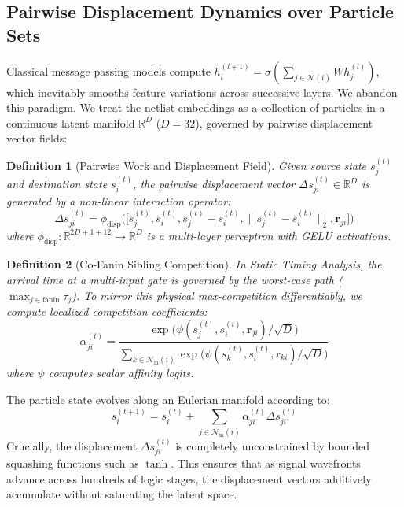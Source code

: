 \documentclass[conference]{IEEEtran}
\newtheorem{definition}{Definition}
\begin{document}
\subsection{Pairwise Displacement Dynamics over Particle Sets}
Classical message passing models compute $h_i^{(l+1)} = \sigma(\sum_{j \in \mathcal{N}(i)} W h_j^{(l)})$, which inevitably smooths feature variations across successive layers. We abandon this paradigm. We treat the netlist embeddings as a collection of particles in a continuous latent manifold $\mathbb{R}^D$ ($D=32$), governed by pairwise displacement vector fields:

\begin{definition}[Pairwise Work and Displacement Field]
Given source state $s_j^{(t)}$ and destination state $s_i^{(t)}$, the pairwise displacement vector $\Delta s_{ji}^{(t)} \in \mathbb{R}^D$ is generated by a non-linear interaction operator:
\begin{equation}
\Delta s_{ji}^{(t)} = \phi_{\text{disp}}\Big( \big[ s_j^{(t)}, s_i^{(t)}, s_j^{(t)} - s_i^{(t)}, \|s_j^{(t)} - s_i^{(t)}\|_2, \mathbf{r}_{ji} \big] \Big)
\end{equation}
where $\phi_{\text{disp}}: \mathbb{R}^{2D + 1 + 12} \to \mathbb{R}^D$ is a multi-layer perceptron with GELU activations.
\end{definition}

\begin{definition}[Co-Fanin Sibling Competition]
In Static Timing Analysis, the arrival time at a multi-input gate is governed by the worst-case path ($\max_{j \in \text{fanin}} \tau_j$). To mirror this physical max-competition differentiably, we compute localized competition coefficients:
\begin{equation}
\alpha_{ji}^{(t)} = \frac{\exp\big( \psi(s_j^{(t)}, s_i^{(t)}, \mathbf{r}_{ji}) / \sqrt{D} \big)}{\sum_{k \in \mathcal{N}_{\text{in}}(i)} \exp\big( \psi(s_k^{(t)}, s_i^{(t)}, \mathbf{r}_{ki}) / \sqrt{D} \big)}
\end{equation}
where $\psi$ computes scalar affinity logits.
\end{definition}

The particle state evolves along an Eulerian manifold according to:
\begin{equation}
s_i^{(t+1)} = s_i^{(t)} + \sum_{j \in \mathcal{N}_{\text{in}}(i)} \alpha_{ji}^{(t)} \Delta s_{ji}^{(t)}
\end{equation}
Crucially, the displacement $\Delta s_{ji}^{(t)}$ is completely unconstrained by bounded squashing functions such as $\tanh$. This ensures that as signal wavefronts advance across hundreds of logic stages, the displacement vectors additively accumulate without saturating the latent space.
\end{document}
